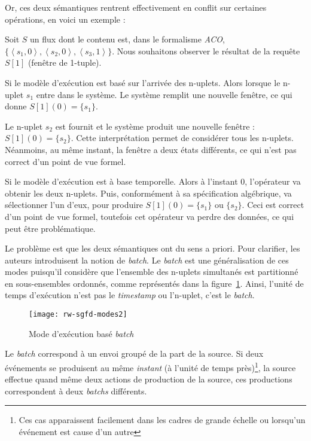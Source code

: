 Or, ces deux sémantiques rentrent effectivement en conflit sur certaines opérations, en voici un exemple :
\begin{example}\label{ex:rw:sgfd:batches}
 Soit $S$ un flux dont le contenu est, dans le formalisme \textit{ACO}, $\{\left<s_1,0\right>, \left<s_2,0\right>, \left<s_3,1\right>\}$. Nous souhaitons observer le résultat de la requête $S[1]$ (fenêtre de 1-tuple).

Si le modèle d'exécution est basé sur l'arrivée des n-uplets. Alors lorsque le n-uplet $s_1$ entre dans le système. Le système remplit une nouvelle fenêtre, ce qui donne $S[1](0)=\{s_1\}$. 

Le n-uplet $s_2$ est fournit et le système produit une nouvelle fenêtre : $S[1](0)=\{s_2\}$. Cette interprétation permet de considérer tous les n-uplets. Néanmoins, au même instant, la fenêtre a deux états différents, ce qui n'est pas correct d'un point de vue formel.

Si le modèle d'exécution est à base temporelle. Alors à l'instant 0, l'opérateur va obtenir les deux n-uplets. Puis, conformément à sa spécification algébrique, va sélectionner l'un d'eux, pour produire $S[1](0) = \{s_1\}$ ou $\{s_2\}$. Ceci est correct d'un point de vue formel, toutefois cet opérateur va perdre des données, ce qui peut être problématique.
\end{example}

Le problème est que les deux sémantiques ont du sens a priori. Pour clarifier, les auteurs introduisent la notion de \textit{batch}. Le \textit{batch} est une généralisation de ces modes puisqu'il considère que l'ensemble des n-uplets simultanés est partitionné en sous-ensembles ordonnés, comme représentés dans la figure~\ref{fig:rw:sgfd:mode:batch}. Ainsi, l'unité de temps d'exécution n'est pas le \textit{timestamp} ou l'n-uplet, c'est le \textit{batch}.
\begin{figure}[ht]
    \centering
		\texttt{[image: rw-sgfd-modes2]}
    \caption{Mode d'exécution basé \textit{batch}}\label{fig:rw:sgfd:mode:batch}
\end{figure}

Le \textit{batch} correspond à un envoi groupé de la part de la source. Si deux événements se produisent au même \textit{instant} (à l'unité de temps près)\footnote{Ces cas apparaissent facilement dans les cadres de grande échelle ou lorsqu'un événement est cause d'un autre}, la source effectue quand même deux actions de production de la source, ces productions correspondent à deux \textit{batchs} différents.

